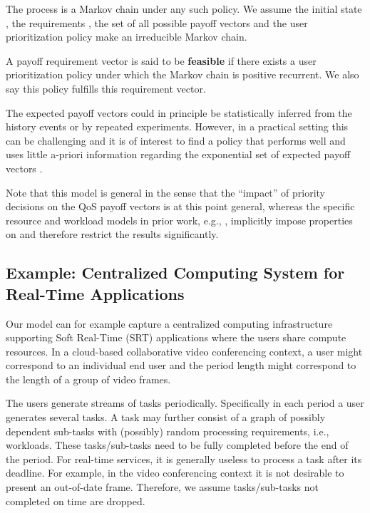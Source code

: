 \documentclass[prodmode,acmtompecs]{acmsmall}
\begin{document}
The process  is a Markov chain under any such policy. We assume the initial state , the requirements , the set of all possible payoff vectors and the user prioritization policy make  an irreducible Markov chain. 

\begin{definition}
\label{defn_feasibility_pr}
A payoff requirement vector  is said to be {\bf feasible} if there exists a user prioritization policy  under which the Markov chain  is positive recurrent. We also say this policy fulfills this requirement vector. 
\end{definition}

The expected payoff vectors  could in principle be statistically inferred from the history events or by repeated experiments. 
However, in a practical setting this can be challenging and it is of interest to find a policy that performs well and uses little a-priori information regarding the exponential set of expected payoff vectors . 

Note that this model is general in the sense that the ``impact'' of priority decisions  on the QoS payoff vectors  is at this point general, whereas the specific resource and workload models in prior work, e.g., \cite{DiW06,JLS07,KWJ13}, implicitly impose properties on  and therefore restrict the results significantly. 

\subsection{Example: Centralized Computing System for Real-Time Applications}
\label{subsection_SRT_model}
Our model can for example capture a centralized computing infrastructure supporting Soft Real-Time (SRT) applications where the  users share compute resources. In a cloud-based collaborative video conferencing context, a user might correspond to an individual end user and the period length might correspond to the length of a group of video frames. 

The users generate streams of tasks periodically. Specifically in each period a user generates several tasks. A task may further consist of a graph of possibly dependent sub-tasks with (possibly) random processing requirements, i.e., workloads. These tasks/sub-tasks need to be fully completed before the end of the period. 
For real-time services, it is generally useless to process a task after its deadline. For example, in the video conferencing context it is not desirable to present an out-of-date frame.  Therefore, we assume tasks/sub-tasks not completed on time are dropped. 
\end{document}
